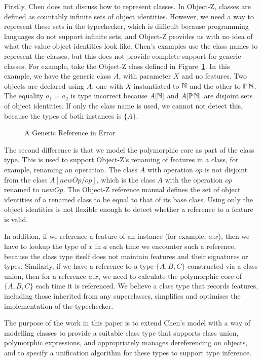Firstly, Chen does not discuss how to represent classes. In Object-Z,
classes are defined as countably infinite sets of object
identities. However, we need a way to represent these sets in the
typechecker, which is difficult because programming languages do not
support infinite sets, and Object-Z provides us with no idea of what
the value object identities look like. Chen's examples use the class
names to represent the classes, but this does not provide complete
support for generic classes. For example, take the Object-Z class
defined in Figure~\ref{generic-class-A}.  In this example, we have the
generic class $A$, with parameter $X$ and no features.  Two objects
are declared using $A$: one with $X$ instantiated to ${\mathbb N}$ and the
other to $\power \nat$. The equality $a_{1} = a_{2}$ is type incorrect
because $A[{\mathbb N}]$ and $A[\power \nat]$ are disjoint sets of object
identities. If only the class name is used, we cannot not detect this,
because the types of both instances is $\{A\}$. 

\begin{figure}[t]

\caption{A Generic Reference in Error}
\label{generic-class-A}
\end{figure}

The second difference is that we model the polymorphic core as part of
the class type. This is used to support Object-Z's renaming of
features in a class, for example, renaming an operation. The class $A$
with operation $op$ is not disjoint from the class $A[newOp/op]$,
which is the class $A$ with the operation $op$ renamed to $newOp$. The
Object-Z reference manual \cite{smith00} defines the set of object
identities of a renamed class to be equal to that of its base
class. Using only the object identities is not flexible enough to
detect whether a reference to a feature is valid.

In addition, if we reference a feature of an instance (for example,
$a.x$), then we have to lookup the type of $x$ in $a$ each time we
encounter such a reference, because the class type itself does not
maintain features and their signatures or types.  Similarly, if we
have a reference to a type $\{ A, B, C\}$ constructed via a class
union, then for a reference $a.x$, we need to calculate the
polymorphic core of $\{A,B,C\}$ each time it is referenced. We believe
a class type that records features, including those inherited from any
superclasses, simplifies and optimises the implementation of the
typechecker.

The purpose of the work in this paper is to extend Chen's model with a
way of modelling classes to provide a suitable class type that
supports class union, polymorphic expressions, and appropriately
manages dereferencing on objects, and to specify a unification
algorithm for these types to support type inference.

